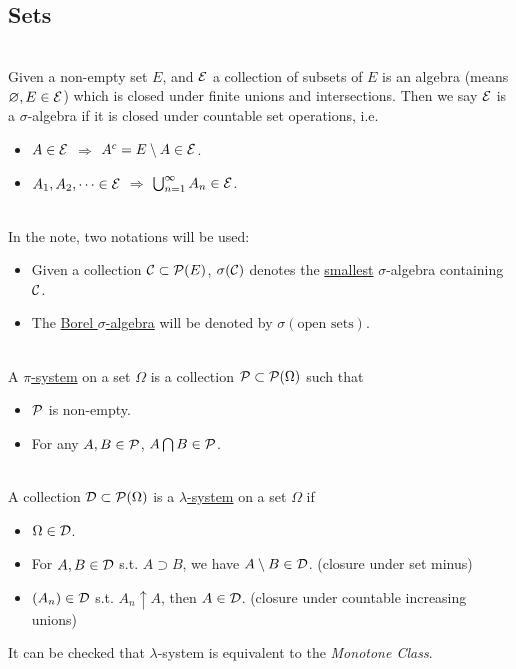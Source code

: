 \subsection{Sets}
\begin{definition}\ \\
Given a non-empty set $E$, and $\mathcal{E}$ a collection of subsets of $E$ is an algebra (means $\varnothing,E \in \mathcal{E}$) which is closed under finite unions and intersections. Then we say $\mathcal{E}$ is a $\sigma$-algebra if it is closed under countable set operations, i.e.
\begin{itemize}
    \item $A \in \mathcal{E}$ $\Rightarrow$ $A^c = E \setminus A \in \mathcal{E}$.
    \item $A_1, A_2,\dots \in \mathcal{E}$ $\Rightarrow$ $\bigcup_{n=1}^\infty A_n \in \mathcal{E}$.
\end{itemize}
\end{definition}
\begin{remark}\ \\
In the note, two notations will be used:
\begin{itemize}
    \item Given a collection $\mathcal{C} \subset \mathcal{P}(E)$, $\sigma(\mathcal{C})$ denotes the \underline{smallest} $\sigma$-algebra containing $\mathcal{C}$.
    \item The \underline{Borel $\sigma$-algebra} will be denoted by $\sigma(\text{open sets})$.
\end{itemize}
\end{remark}

\begin{definition}\ \\
A \underline{$\pi$-system} on a set $\Omega$ is a collection $\mathcal{P} \subset \mathcal{P}(\Omega)$ such that
\begin{itemize}
    \item $\mathcal{P}$ is non-empty.
    \item For any $A,B \in \mathcal{P}$, $A \bigcap B \in \mathcal{P}$.
\end{itemize}
\end{definition}

\begin{definition}\ \\
A collection $\mathcal{D} \subset \mathcal{P}(\Omega)$ is a \underline{$\lambda$-system} on a set $\Omega$ if
\begin{itemize}
    \item $\Omega \in \mathcal{D}$.
    \item For $A,B \in \mathcal{D}$ s.t. $A \supset B$, we have $A \setminus B \in \mathcal{D}$. (closure under set minus)
    \item $(A_n) \in \mathcal{D}$ s.t. $A_n \uparrow A$, then $A \in \mathcal{D}$. (closure under countable increasing unions)
\end{itemize}
\end{definition}
\begin{remark}
It can be checked that $\lambda$-system is equivalent to the \textit{Monotone Class}.
\end{remark}

